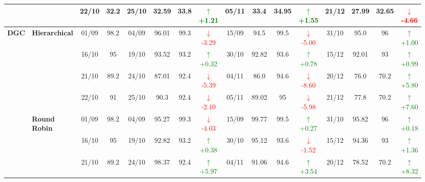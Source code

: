 \documentclass{ieeeaccess}
\begin{document}
{\begin{longtable}{llcc|cccc|cccc|cccc}
&
& 22/10 & 32.2 & 25/10 & 32.59 & 33.8 & \textcolor{green}{\(\uparrow\)+1.21} & 05/11 & 33.4 & 34.95 & \textcolor{green}{\(\uparrow\)+1.55} & 21/12 & 27.99 & 32.65 & \textcolor{red}{\(\downarrow\)-4.66} \\
\midrule




\multirow{12}{*}{\textbf{DGC}} 
& \textbf{Hierarchical}
& 01/09 & 98.2 & 04/09 & 96.01 & 99.3 & \textcolor{red}{\(\downarrow\)-3.29} & 15/09 & 94.5 & 99.5 & \textcolor{red}{\(\downarrow\)-5.00} & 31/10 & 95.0 & 96 & \textcolor{green}{\(\uparrow\)+1.00} \\

&
& 16/10 & 95 & 19/10 & 93.52 & 93.2 & \textcolor{green}{\(\uparrow\)+0.32} & 30/10 & 92.82 & 93.6 & \textcolor{green}{\(\uparrow\)+0.78} & 15/12 & 92.01 & 93 & \textcolor{green}{\(\uparrow\)+0.99} \\

&
& 21/10 & 89.2 & 24/10 & 87.01 & 92.4 & \textcolor{red}{\(\downarrow\)-5.39} & 04/11 & 86.0 & 94.6 & \textcolor{red}{\(\downarrow\)-8.60} & 20/12 & 76.0 & 70.2 & \textcolor{green}{\(\uparrow\)+5.80} \\

&
& 22/10 & 91 & 25/10 & 90.3 & 92.4 & \textcolor{red}{\(\downarrow\)-2.10} & 05/11 & 89.02 & 95 & \textcolor{red}{\(\downarrow\)-5.98} & 21/12 & 77.8 & 70.2 & \textcolor{green}{\(\uparrow\)+7.60} \\
\cmidrule(lr){2-16}


& \textbf{Round Robin}
& 01/09 & 98.2 & 04/09 & 95.27 & 99.3 & \textcolor{red}{\(\downarrow\)-4.03} & 15/09 & 99.77 & 99.5 & \textcolor{green}{\(\uparrow\)+0.27} & 31/10 & 95.82 & 96 & \textcolor{green}{\(\uparrow\)+0.18} \\

&
& 16/10 & 95 & 19/10 & 92.82 & 93.2 & \textcolor{green}{\(\uparrow\)+0.38} & 30/10 & 95.12 & 93.6 & \textcolor{red}{\(\downarrow\)-1.52} & 15/12 & 94.36 & 93 & \textcolor{green}{\(\uparrow\)+1.36} \\

&
& 21/10 & 89.2 & 24/10 & 98.37 & 92.4 & \textcolor{green}{\(\uparrow\)+5.97} & 04/11 & 91.06 & 94.6 & \textcolor{green}{\(\uparrow\)+3.54} & 20/12 & 78.52 & 70.2 & \textcolor{green}{\(\uparrow\)+8.32} \\


\end{longtable}}
\end{document}
